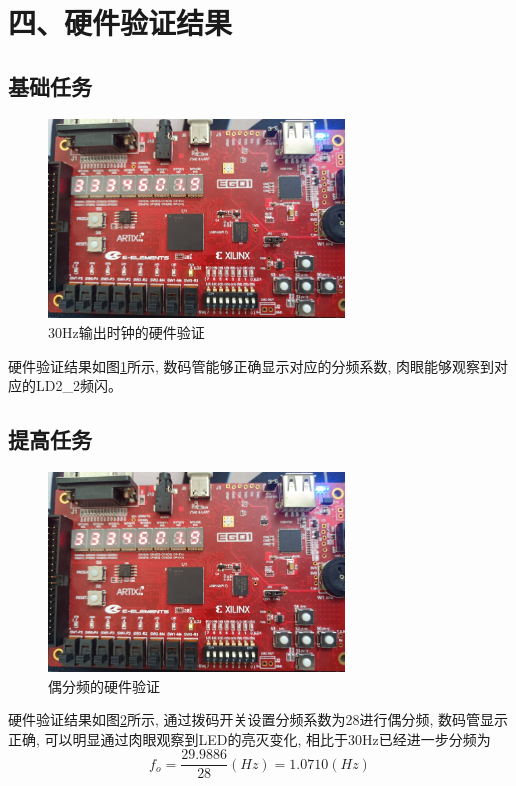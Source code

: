 \documentclass{article}
\newcommand{\fourhao}{\fontsize{14pt}{\baselineskip}\selectfont} %
\newcommand{\xiaosihao}{\fontsize{12pt}{\baselineskip}\selectfont} %
\begin{document}
\section*{\fourhao 四、硬件验证结果}
\xiaosihao
{}
\subsection*{基础任务}
\begin{figure}[H]
    \centering
    \includegraphics[width=0.7\textwidth]{image/2024-06-18-09-38-37.png}
    \caption{30Hz输出时钟的硬件验证}
    \label{image_30Hz_verify}
\end{figure}
硬件验证结果如图\ref{image_30Hz_verify}所示, 数码管能够正确显示对应的分频系数, 肉眼能够观察到对应的LD2\_2频闪。
\subsection*{提高任务}
\begin{figure}[H]
    \centering
    \includegraphics[width=0.7\textwidth]{image/2024-06-18-09-38-37.png}
    \caption{偶分频的硬件验证}
    \label{image_even_verify}
\end{figure}
硬件验证结果如图\ref{image_even_verify}所示, 通过拨码开关设置分频系数为28进行偶分频, 数码管显示正确, 可以明显通过肉眼观察到LED的亮灭变化, 相比于30Hz已经进一步分频为
$$f_o = \frac{29.9886}{28}(Hz) = 1.0710 (Hz)$$
\end{document}
